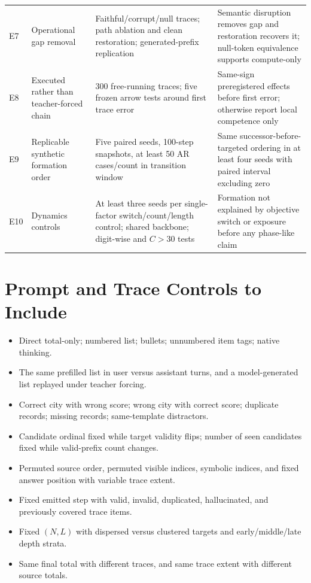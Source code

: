 \documentclass[11pt]{article}
\begin{document}
\begin{table}[H]
\begin{tabularx}{\textwidth}{@{}P{.06\textwidth}P{.19\textwidth}P{.35\textwidth}Y@{}}
E7 & Operational gap removal & Faithful/corrupt/null traces; path ablation and clean restoration; generated-prefix replication & Semantic disruption removes gap and restoration recovers it; null-token equivalence supports compute-only \\
E8 & Executed rather than teacher-forced chain & 300 free-running traces; five frozen arrow tests around first trace error & Same-sign preregistered effects before first error; otherwise report local competence only \\
E9 & Replicable synthetic formation order & Five paired seeds, 100-step snapshots, at least 50 AR cases/count in transition window & Same successor-before-targeted ordering in at least four seeds with paired interval excluding zero \\
E10 & Dynamics controls & At least three seeds per single-factor switch/count/length control; shared backbone; digit-wise and $C>30$ tests & Formation not explained by objective switch or exposure before any phase-like claim \\
\bottomrule
\end{tabularx}
\end{table}

\section{Prompt and Trace Controls to Include}

\begin{itemize}
  \item Direct total-only; numbered list; bullets; unnumbered item tags; native thinking.
  \item The same prefilled list in user versus assistant turns, and a model-generated list replayed under teacher forcing.
  \item Correct city with wrong score; wrong city with correct score; duplicate records; missing records; same-template distractors.
  \item Candidate ordinal fixed while target validity flips; number of seen candidates fixed while valid-prefix count changes.
  \item Permuted source order, permuted visible indices, symbolic indices, and fixed answer position with variable trace extent.
  \item Fixed emitted step with valid, invalid, duplicated, hallucinated, and previously covered trace items.
  \item Fixed $(N,L)$ with dispersed versus clustered targets and early/middle/late depth strata.
  \item Same final total with different traces, and same trace extent with different source totals.
\end{itemize}
\end{document}
